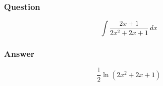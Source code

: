 \documentclass[12pt, t]{beamer}
\begin{document}
\begin{frame}
    \frametitle{Question}
    \vfill
    \begin{Large}
        \begin{equation*}
            \int \frac{2x+1}{2x^2+2x+1}\,dx
        \end{equation*}    
    \end{Large}
    \vfill
\end{frame}

\begin{frame}
    \frametitle{Answer}
    \vfill
    \begin{Large}
        \begin{equation*}
            \frac{1}{2}\ln(2x^2+2x+1)
        \end{equation*}    
    \end{Large}
    \vfill
\end{frame}
\end{document}
